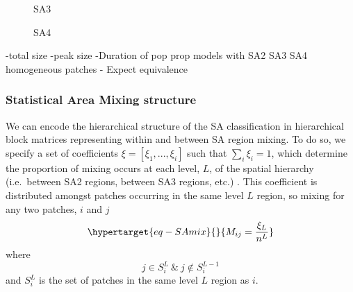 \documentclass[
  letterpaper,
  DIV=11,
  numbers=noendperiod]{scrartcl}
\begin{document}
\begin{figure}

\begin{minipage}[t]{0.50\linewidth}

{\centering 


\caption{\label{fig-GMelb_PPM-1}SA3}

}

\end{minipage}%
%
\begin{minipage}[t]{0.50\linewidth}

{\centering 


\caption{\label{fig-GMelb_PPM-2}SA4}

}

\end{minipage}%

\end{figure}

-total size -peak size -Duration of pop prop models with SA2 SA3 SA4
homogeneous patches - Expect equivalence

\hypertarget{sec-SAmixmat}{%
\subsubsection{Statistical Area Mixing structure}\label{sec-SAmixmat}}

We can encode the hierarchical structure of the SA classification in
hierarchical block matrices representing within and between SA region
mixing. To do so, we specify a set of coefficients
\(\xi = [\xi_1, ..., \xi_i]\) such that \(\sum\limits_{i}\xi_{i}=1\),
which determine the proportion of mixing occurs at each level, \(L\), of
the spatial hierarchy (i.e.~between SA2 regions, between SA3 regions,
etc.) . This coefficient is distributed amongst patches occurring in the
same level \(L\) region, so mixing for any two patches, \(i\) and \(j\)
\begin{equation}\protect\hypertarget{eq-SAmix}{}{
M_{ij}= \frac{\xi_{L}}{n^{L}} 
}\label{eq-SAmix}\end{equation} where \[
j \in S_{i}^{L} \  \& \ j \notin S_{i}^{L-1}
\] and \(S_{i}^{L}\) is the set of patches in the same level \(L\)
region as \(i\).
\end{document}
